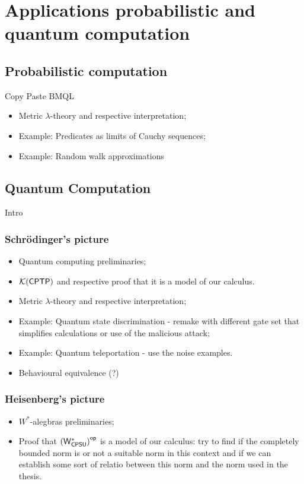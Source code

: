 \documentclass[10pt,a4paper]{amsart}
\theoremstyle{definition}
\theoremstyle{definition}
\theoremstyle{definition}
\theoremstyle{definition}
\theoremstyle{definition}
\theoremstyle{definition}
\begin{document}
\section{Applications probabilistic and quantum computation}

\subsection{Probabilistic computation}

Copy Paste BMQL

\begin{itemize}
  \item Metric $\lambda$-theory and respective interpretation;
  \item Example: Predicates as limits of Cauchy sequences;
  \item Example: Random walk approximations
\end{itemize}

\subsection{Quantum Computation}
Intro
\subsubsection{Schrödinger's picture}
\begin{itemize}
  \item Quantum computing preliminaries;
  \item $\mathcal{K}{(\mathsf{CPTP})}$ and respective proof that it is a model of our calculus.
  \item Metric $\lambda$-theory and respective interpretation;
  \item Example: Quantum state discrimination - remake with different gate set that simplifies calculations or use of the malicious attack;
  \item Example: Quantum teleportation - use the noise examples.
  \item Behavioural equivalence (?)
\end{itemize}

\subsubsection{Heisenberg's picture} 
\begin{itemize}
  \item $W^*$-alegbras preliminaries;
  \item Proof that $\left(\mathsf{W^*_{CPSU}}\right)^{\mathsf{op}}$ is a model of our calculus: try to find if the completely bounded norm is or not a suitable norm in this context and if we can establish some sort of relatio between this norm and the norm used in the thesis. 
\end{itemize}




\newpage
 

\end{document}
